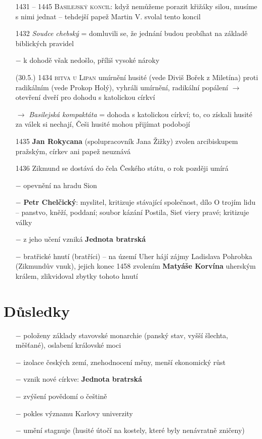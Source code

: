 \documentclass{article}
\begin{document}
\begin{itemize}
    \vspace{-0.5em}
    \setlength\itemsep{0.15em}
    \item[1431 -- 1445] \textsc{Basilejský koncil}: když nemůžeme porazit křižáky silou, musíme s nimi jednat -- tehdejší papež Martin V. svolal tento koncil
    \item[1432] \textit{Soudce chebský} = domluvili se, že jednání budou probíhat na základě biblických pravidel
    \item[$-$] k dohodě však nedošlo, příliš vysoké nároky
    \item[(30.5.) 1434] \textsc{bitva u Lipan} umírnění husité (vede Diviš Bořek z Miletína) proti radikálním (vede Prokop Holý), vyhráli umírnění, radikální popálení $\rightarrow$ otevření dveří pro dohodu s katolickou církví
    \item[$\rightarrow$] \textit{Basilejská kompaktáta} = dohoda s katolickou církví; to, co získali husité za válek si nechají, Češi husité mohou přijímat podobojí
    \item[1435] \textbf{Jan Rokycana} (spolupracovník Jana Žižky) zvolen arcibiskupem pražským, církev ani papež neuznává
    \item[1436] Zikmund se dostává do čela Českého státu, o rok později umírá
    \item[$-$] opevnění na hradu Sion
    \item[$-$] \textbf{Petr Chelčický}: myslitel, kritizuje stávající společnost, dílo O trojím lidu -- panstvo, kněží, poddaní; soubor kázání Postila, Sieť viery pravé; kritizuje války
    \item[$-$] z jeho učení vzniká \textbf{Jednota bratrská}
    \item[$-$] bratřické hnutí (bratříci) -- na území Uher hájí zájmy Ladislava Pohrobka (Zikmundův vnuk), jejich konec 1458 zvolením \textbf{Matyáše Korvína} uherským králem, zlikvidoval zbytky tohoto hnutí

\end{itemize}

\section*{Důsledky}
\begin{itemize}
    \vspace{-0.5em}
    \setlength\itemsep{0.15em}
    \item[$-$] položeny základy stavovské monarchie (panský stav, vyšší šlechta, měšťané), oslabení královské moci
    \item[$-$] izolace českých zemí, znehodnocení měny, menší ekonomický růst
    \item[$-$] vznik nové církve: \textbf{Jednota bratrská}
    \item[$-$] zvýšení povědomí o češtině
    \item[$-$] pokles významu Karlovy univerzity
    \item[$-$] umění stagnuje (husité útočí na kostely, které byly nenávratně zničeny)
\end{itemize}
\end{document}
